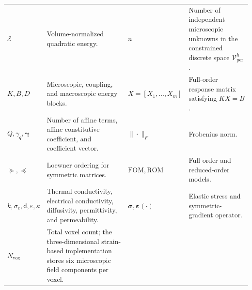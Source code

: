 \documentclass[pdflatex,sn-basic,Numbered]{sn-jnl}
\begin{document}
\begin{tabularx}{\textwidth}{@{}lXlX@{}}
\(\mathcal E\) &
Volume-normalized quadratic energy. &
\(n\) &
Number of independent microscopic unknowns in the constrained discrete space
\(\mathcal V_{\mathrm{per}}^h\). \\

\(K,B,D\) &
Microscopic, coupling, and macroscopic energy blocks. &
\(X=[X_1,\ldots,X_m]\) &
Full-order response matrix satisfying \(KX=B\). \\

\(Q,\gamma_q,\boldsymbol\gamma\) &
Number of affine terms, affine constitutive coefficient, and coefficient vector. &
\(\|\cdot\|_F\) &
Frobenius norm. \\

\(\succeq,\preceq\) &
Loewner ordering for symmetric matrices. &
\(\mathrm{FOM},\mathrm{ROM}\) &
Full-order and reduced-order models. \\

\(k,\sigma_e,\mathsf d,\varepsilon,\kappa\) &
Thermal conductivity, electrical conductivity, diffusivity, permittivity, and permeability. &
\(\boldsymbol{\sigma},\boldsymbol{\varepsilon}(\cdot)\) &
Elastic stress and symmetric-gradient operator. \\

\(N_{\mathrm{vox}}\) &
Total voxel count; the three-dimensional strain-based implementation stores
six microscopic field components per voxel. & & \\

\bottomrule
\end{tabularx}
\end{document}
